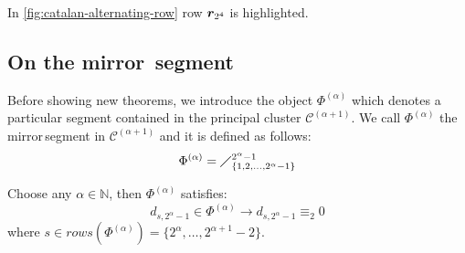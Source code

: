 
In \autoref{fig:catalan-alternating-row} row $\boldsymbol{r}_{2^{4}}$ is highlighted.

\subsection{On the \flqq mirror\frqq\, segment}

Before showing new theorems, we introduce the object
$\Phi^{(\alpha)}$ which denotes a particular segment contained 
in the principal cluster $\mathcal{C}^{(\alpha+1)}$. 
We call $\Phi^{(\alpha)}$ the \flqq mirror\frqq\,segment in 
$\mathcal{C}^{(\alpha+1)}$ and it is defined as follows:
\begin{displaymath}
    \Phi^{(\alpha)}=\diagup_{\lbrace 1,2,\ldots,2^{\alpha}-1\rbrace}^{2^{\alpha}-1}
\end{displaymath}

\begin{theorem}
    Choose any $\alpha\in\mathbb{N}$, then $\Phi^{(\alpha)}$ satisfies: 
    \begin{displaymath}
        d_{s,2^{\alpha}-1}\in\Phi^{(\alpha)} \rightarrow d_{s,2^{\alpha}-1}\equiv_{2}0
    \end{displaymath}
    where $s\in rows\left(\Phi^{(\alpha)}\right)=\lbrace2^{\alpha},\ldots,2^{\alpha+1}-2\rbrace$.
    \label{thm:mirror:segment:definition}
\end{theorem}

